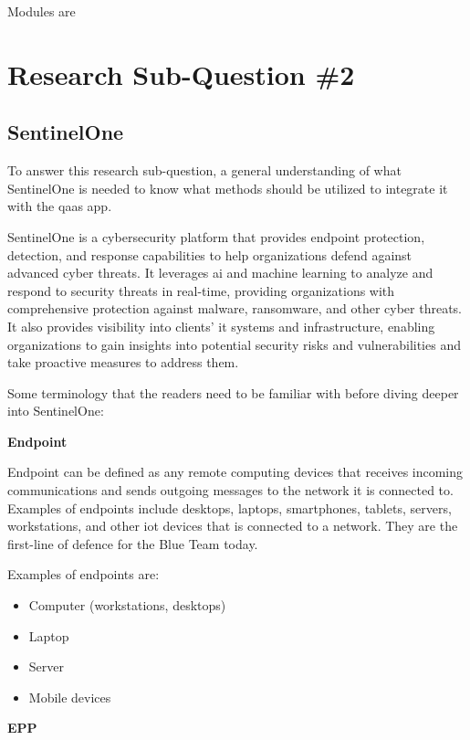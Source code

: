 \begin{multicols}{2}
      Modules are

      \section{Research Sub-Question \#2}
      \subsection{SentinelOne} %
      To answer this research sub-question, a general understanding of what SentinelOne is needed to know what
      methods should be utilized to integrate it with the \acrshort{qaas} app.

      SentinelOne is a cybersecurity platform that provides endpoint protection, detection, and response capabilities to
      help organizations defend against advanced cyber threats. It leverages \acrlong{ai} and machine learning to analyze
      and respond to security threats in real-time, providing organizations with comprehensive protection against malware,
      ransomware, and other cyber threats. It also provides visibility into clients' \acrshort{it} systems and infrastructure,
      enabling organizations to gain insights into potential security risks and vulnerabilities and take proactive measures
      to address them.

      Some terminology that the readers need to be familiar with before diving deeper into SentinelOne:

      \textbf{Endpoint}

      Endpoint can be defined as any remote computing devices that receives incoming communications and sends outgoing messages
      to the network it is connected to. Examples of endpoints include desktops, laptops, smartphones, tablets, servers, workstations,
      and other \acrshort{iot} devices that is connected to a network. They are the first-line of defence for the Blue Team today.

      Examples of endpoints are:
      \begin{itemize}
            \item Computer (workstations, desktops)
            \item Laptop
            \item Server
            \item Mobile devices
      \end{itemize}

      \textbf{EPP}


\end{multicols}
